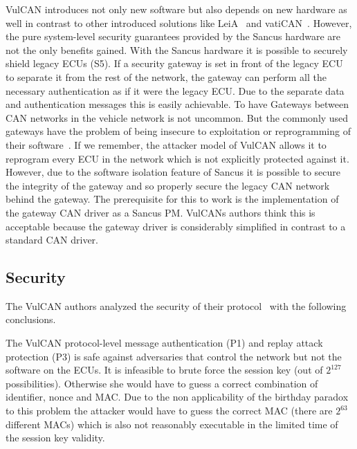 VulCAN introduces not only new software but also depends on new hardware as well
in contrast to other introduced solutions like LeiA~\cite{Radu2016} and
vatiCAN~\cite{Nurnberger2016}. However, the pure system-level security
guarantees provided by the Sancus hardware are not the only benefits gained.
With the Sancus hardware it is possible to securely shield legacy ECUs (S5). If
a security gateway is set in front of the legacy ECU to separate it from the
rest of the network, the gateway can perform all the necessary authentication as
if it were the legacy ECU\@. Due to the separate data and authentication
messages this is easily achievable. To have Gateways between CAN networks in the
vehicle network is not uncommon. But the commonly used gateways have the problem
of being insecure to exploitation or reprogramming of their
software~\cite{Checkoway2011}. If we remember, the attacker model of VulCAN
allows it to reprogram every ECU in the network which is not explicitly
protected against it. However, due to the software isolation feature of Sancus
it is possible to secure the integrity of the gateway and so properly secure the
legacy CAN network behind the gateway. The prerequisite for this to work is the
implementation of the gateway CAN driver as a Sancus PM\@. VulCANs authors think
this is acceptable because the gateway driver is considerably simplified in
contrast to a standard CAN driver.

\subsection{Security}

The VulCAN authors analyzed the security of their protocol~\cite{VanBulck2017} with the following conclusions.

\smallskip
The VulCAN protocol-level message authentication (P1) and replay attack
protection (P3) is safe against adversaries that control the network but not the
software on the ECUs. It is infeasible to brute force the session key (out of
\(2^{127}\) possibilities). Otherwise she would have to guess a correct
combination of identifier, nonce and MAC\@. Due to the non applicability of the
birthday paradox to this problem the attacker would have to guess the correct
MAC (there are \(2^{63}\) different MACs) which is also not reasonably executable
in the limited time of the session key validity. 

